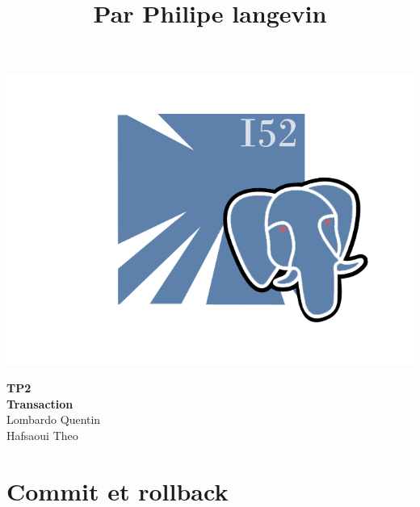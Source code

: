 \documentclass[a4paper,11pt]{article}
\title{\color{OrangeHaf} Par Philipe langevin}
\date{}
\begin{document}
\pagecolor{BlackHaf}
   \noindent\begin{minipage}{0.4\textwidth}%
    \includegraphics[width=\linewidth]{Logotp.png}
    \end{minipage}%
  \hfill%
  \begin{minipage}{0.5\textwidth}\raggedleft
     \textbf{\color{OrangeHaf}\huge TP2 \\Transaction}\\
     Lombardo Quentin\\
     Hafsaoui Theo
  \end{minipage}
  \section{\color{LightOrangeHaf}Commit et rollback}
\end{document}
